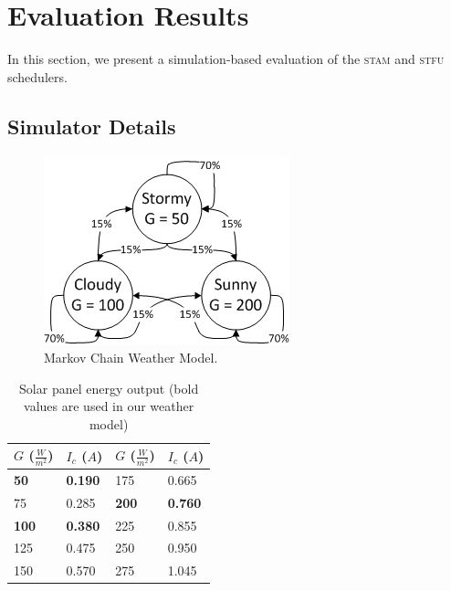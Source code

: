 \section{Evaluation Results} \label{sec:simulation}

In this section, we present a simulation-based evaluation of the \textsc{stam} and \textsc{stfu} schedulers. 

\subsection{Simulator Details }

\begin{figure}[htb]
\begin{center}
\caption{Markov Chain Weather Model.\label{fig:markov}}
\includegraphics[scale=0.7]{markov.png}
\end{center}
\end{figure}

\begin{table}[h]
\caption{Solar panel energy output (bold values are used in our weather model)\label{tab:radiance}}
\begin{center}
\begin{tabular}{| l | l || l | l |}
\hline
\textbf{$G$ ($\frac{W}{m^2}$)} & \textbf{$I_c$ ($A$)} & \textbf{$G$ ($\frac{W}{m^2}$)} & \textbf{$I_c$ ($A$)} \\
\hline
\textbf{50} & \textbf{0.190} & 175 & 0.665 \\
75 & 0.285 & \textbf{200} & \textbf{0.760} \\
\textbf{100} & \textbf{0.380} & 225 & 0.855 \\
125 & 0.475 & 250 & 0.950 \\
150 & 0.570 & 275 & 1.045 \\
\hline
\end{tabular}
\end{center}
\end{table}

